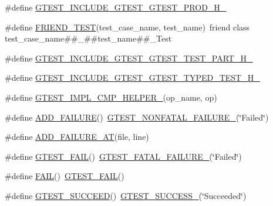 \begin{DoxyCompactItemize}
\#define \hyperlink{fused-src_2gtest_2gtest_8h_a61e419ca2f3cc78bbae47d074c5d4400}{\-G\-T\-E\-S\-T\-\_\-\-I\-N\-C\-L\-U\-D\-E\-\_\-\-G\-T\-E\-S\-T\-\_\-\-G\-T\-E\-S\-T\-\_\-\-P\-R\-O\-D\-\_\-\-H\-\_\-}
\item 
\#define \hyperlink{fused-src_2gtest_2gtest_8h_a8d443b4cc1d87a7a17943b8fbdbf3910}{\-F\-R\-I\-E\-N\-D\-\_\-\-T\-E\-S\-T}(test\-\_\-case\-\_\-name, test\-\_\-name)~friend class test\-\_\-case\-\_\-name\#\#\-\_\-\#\#test\-\_\-name\#\#\-\_\-\-Test
\item 
\#define \hyperlink{fused-src_2gtest_2gtest_8h_a6454a5e01489b59f55be53c206ca929b}{\-G\-T\-E\-S\-T\-\_\-\-I\-N\-C\-L\-U\-D\-E\-\_\-\-G\-T\-E\-S\-T\-\_\-\-G\-T\-E\-S\-T\-\_\-\-T\-E\-S\-T\-\_\-\-P\-A\-R\-T\-\_\-\-H\-\_\-}
\item 
\#define \hyperlink{fused-src_2gtest_2gtest_8h_adddef1e04ac44c9721ce3716c1b8a09e}{\-G\-T\-E\-S\-T\-\_\-\-I\-N\-C\-L\-U\-D\-E\-\_\-\-G\-T\-E\-S\-T\-\_\-\-G\-T\-E\-S\-T\-\_\-\-T\-Y\-P\-E\-D\-\_\-\-T\-E\-S\-T\-\_\-\-H\-\_\-}
\item 
\#define \hyperlink{fused-src_2gtest_2gtest_8h_a4a5b6fbde5dd05e05dd6846ac5e5c18e}{\-G\-T\-E\-S\-T\-\_\-\-I\-M\-P\-L\-\_\-\-C\-M\-P\-\_\-\-H\-E\-L\-P\-E\-R\-\_\-}(op\-\_\-name, op)
\item 
\#define \hyperlink{fused-src_2gtest_2gtest_8h_adc16b5b0a740c39084ea5c9e960e3063}{\-A\-D\-D\-\_\-\-F\-A\-I\-L\-U\-R\-E}()~\hyperlink{gtest-internal_8h_a6cb7482cfa03661a91c698eb5895f642}{\-G\-T\-E\-S\-T\-\_\-\-N\-O\-N\-F\-A\-T\-A\-L\-\_\-\-F\-A\-I\-L\-U\-R\-E\-\_\-}(\char`\"{}\-Failed\char`\"{})
\item 
\#define \hyperlink{fused-src_2gtest_2gtest_8h_a448d7e5105b640e892fd8153fbee0b7f}{\-A\-D\-D\-\_\-\-F\-A\-I\-L\-U\-R\-E\-\_\-\-A\-T}(file, line)
\item 
\#define \hyperlink{fused-src_2gtest_2gtest_8h_a636231436707c30d6778f79ae96f5dc6}{\-G\-T\-E\-S\-T\-\_\-\-F\-A\-I\-L}()~\hyperlink{gtest-internal_8h_a0f9a4c3ea82cc7bf4478eaffdc168358}{\-G\-T\-E\-S\-T\-\_\-\-F\-A\-T\-A\-L\-\_\-\-F\-A\-I\-L\-U\-R\-E\-\_\-}(\char`\"{}\-Failed\char`\"{})
\item 
\#define \hyperlink{fused-src_2gtest_2gtest_8h_a3e26a8d27caa386ed0ea7ce9d5b7c4ed}{\-F\-A\-I\-L}()~\hyperlink{include_2gtest_2gtest_8h_a636231436707c30d6778f79ae96f5dc6}{\-G\-T\-E\-S\-T\-\_\-\-F\-A\-I\-L}()
\item 
\#define \hyperlink{fused-src_2gtest_2gtest_8h_a2690441c38202728f4159ac2462d9720}{\-G\-T\-E\-S\-T\-\_\-\-S\-U\-C\-C\-E\-E\-D}()~\hyperlink{gtest-internal_8h_abe012b550eb3807e8c49f7e161bd1567}{\-G\-T\-E\-S\-T\-\_\-\-S\-U\-C\-C\-E\-S\-S\-\_\-}(\char`\"{}\-Succeeded\char`\"{})

\end{DoxyCompactItemize}
